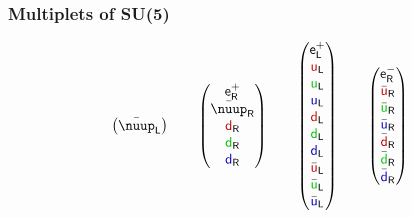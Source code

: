 \documentclass[english, fleqn]{beamer}
\begin{document}
\begin{frame}
    \frametitle{Multiplets of SU(5)}
    \[
        \begin{pmatrix}
            \bar\nuup_\mathsf L
        \end{pmatrix}
        \qquad
        \begin{pmatrix}
            \mathsf e^+_\mathsf R \\
            \bar\nuup_\mathsf R \\
            \textcolor{qred}  {\mathsf d}_\mathsf R \\
            \textcolor{qgreen}{\mathsf d}_\mathsf R \\
            \textcolor{qblue} {\mathsf d}_\mathsf R
        \end{pmatrix}
        \qquad
        \begin{pmatrix}
            \mathsf e^+_\mathsf L \\
            \textcolor{qred}  {\mathsf u}_\mathsf L \\
            \textcolor{qgreen}{\mathsf u}_\mathsf L \\
            \textcolor{qblue} {\mathsf u}_\mathsf L \\
            \textcolor{qred}  {\mathsf d}_\mathsf L \\
            \textcolor{qgreen}{\mathsf d}_\mathsf L \\
            \textcolor{qblue} {\mathsf d}_\mathsf L \\
            \bar{\textcolor{qred}  {\mathsf u}}_\mathsf L \\
            \bar{\textcolor{qgreen}{\mathsf u}}_\mathsf L \\
            \bar{\textcolor{qblue} {\mathsf u}}_\mathsf L
        \end{pmatrix}
        \qquad
        \begin{pmatrix}
            \mathsf e^-_\mathsf R \\
            \bar{\textcolor{qred}  {\mathsf u}}_\mathsf R \\
            \bar{\textcolor{qgreen}{\mathsf u}}_\mathsf R \\
            \bar{\textcolor{qblue} {\mathsf u}}_\mathsf R \\
            \bar{\textcolor{qred}  {\mathsf d}}_\mathsf R \\
            \bar{\textcolor{qgreen}{\mathsf d}}_\mathsf R \\
            \bar{\textcolor{qblue} {\mathsf d}}_\mathsf R \\

\end{pmatrix}\]
\end{frame}
\end{document}
